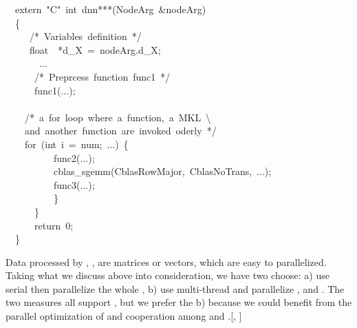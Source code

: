 \documentclass{article}
\begin{document}
\begin{mdpre}%
\noindent~~extern~{"}{C}{"}~{int}~dnn***({NodeArg}~\&nodeArg)\\
~~\{\\
~~~~~{/*}{~Variables~definition~}{*/}\\
~~~~~{float}~~*d\_X~=~nodeArg.d\_X;\\
~~~~~~~...\\
~~~~~~{/*}{~Preprcess~function~func1~}{*/}\\
~~~~~~func1(...);\\
\\
~~~~{/*}{~a~for~loop~where~a~function,~a~MKL~\textbackslash{}}\\
{~~~~and~another~function~are~invoked~oderly~}{*/}\\
~~~~{for}~({int}~i~=~num;~...)~\{\\
~~~~~~~~~~func2(...);\\
~~~~~~~~~~cblas\_sgemm({CblasRowMajor},~{CblasNoTrans},~...);\\
~~~~~~~~~~func3(...);\\
~~~~~~~~~~\}\\
~~~~~~\}~\\
~~~~~~{return}~{0};\\
~~\}\\
\end{mdpre}\noindent{}Data processed by , ,  are matrices or vectors, which are easy to parallelized. Taking what we discuss above into consideration, we have two choose: a) use serial  then parallelize the whole , b) use multi-thread  and parallelize ,  and . The two measures all support , but we prefer the b) because we could benefit from the parallel optimization of  and cooperation among  and .[, ]
\end{document}
